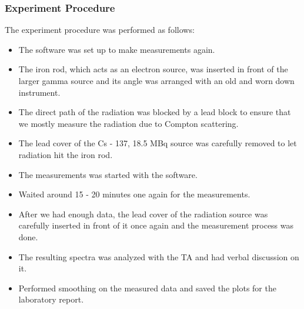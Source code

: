 		\subsubsection{Experiment Procedure}
			The experiment procedure was performed as follows:
				\begin{itemize}
					\item The software was set up to make measurements again. 
					\item The iron rod, which acts as an electron source, was inserted in front of the larger gamma source and its angle was arranged with an old and worn down instrument.
					\item The direct path of the radiation was blocked by a lead block to ensure that we mostly measure the radiation due to Compton scattering.
					\item The lead cover of the Cs - 137, 18.5 MBq source was carefully removed to let radiation hit the iron rod.
					\item The measurements was started with the software.
					\item Waited around 15 - 20 minutes one again for the measurements.
					\item After we had enough data, the lead cover of the radiation source was carefully inserted in front of it once again and the measurement process was done.
					\item The resulting spectra was analyzed with the TA and had verbal discussion on it.
					\item Performed smoothing on the measured data and saved the plots for the laboratory report.
				\end{itemize}
